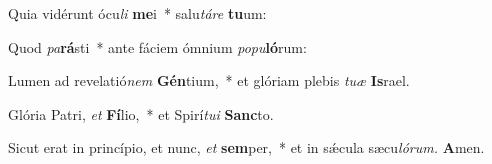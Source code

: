 \item Quia vidérunt ócu\textit{li} \textbf{me}i~* salu\tinyhspace\textit{táre} \textbf{tu}um:
\item Quod \textit{pa}\textbf{rá}sti~* ante fáciem ó\-mnium \textit{popu}\textbf{ló}rum:
\item Lumen ad revelatió\textit{nem} \textbf{Gén}tium,~* et glóriam plebis \textit{tuæ} \textbf{Is}rael.
\item Glória Patri, \textit{et} \textbf{Fí}lio,~* et Spirí\textit{tui} \textbf{Sanc}to.
\item Sicut erat in princípio, et nunc, \textit{et} \textbf{sem}per,~* et in sǽcula sæcu\tinyhspace\textit{lórum.} \textbf{A}men.
